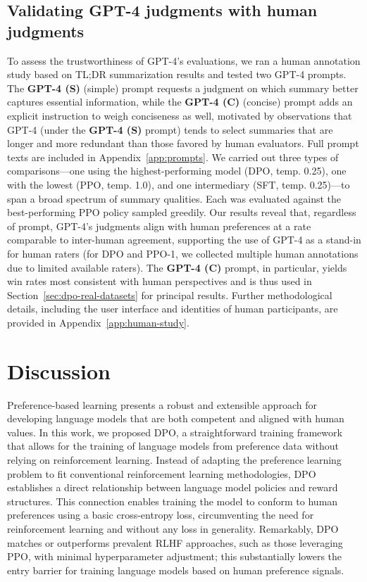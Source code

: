 \subsection{Validating GPT-4 judgments with human judgments}
\label{sec:human-judgments}

To assess the trustworthiness of GPT-4’s evaluations, we ran a human annotation study based on TL;DR summarization results and tested two GPT-4 prompts. The \textbf{GPT-4 (S)} (simple) prompt requests a judgment on which summary better captures essential information, while the \textbf{GPT-4 (C)} (concise) prompt adds an explicit instruction to weigh conciseness as well, motivated by observations that GPT-4 (under the \textbf{GPT-4 (S)} prompt) tends to select summaries that are longer and more redundant than those favored by human evaluators. Full prompt texts are included in Appendix~\ref{app:prompts}. We carried out three types of comparisons—one using the highest-performing model (DPO, temp. 0.25), one with the lowest (PPO, temp. 1.0), and one intermediary (SFT, temp. 0.25)—to span a broad spectrum of summary qualities. Each was evaluated against the best-performing PPO policy sampled greedily. Our results reveal that, regardless of prompt, GPT-4’s judgments align with human preferences at a rate comparable to inter-human agreement, supporting the use of GPT-4 as a stand-in for human raters (for DPO and PPO-1, we collected multiple human annotations due to limited available raters). The \textbf{GPT-4 (C)} prompt, in particular, yields win rates most consistent with human perspectives and is thus used in Section~\ref{sec:dpo-real-datasets} for principal results. Further methodological details, including the user interface and identities of human participants, are provided in Appendix~\ref{app:human-study}.

\section{Discussion}
Preference-based learning presents a robust and extensible approach for developing language models that are both competent and aligned with human values. In this work, we proposed DPO, a straightforward training framework that allows for the training of language models from preference data without relying on reinforcement learning. Instead of adapting the preference learning problem to fit conventional reinforcement learning methodologies, DPO establishes a direct relationship between language model policies and reward structures. This connection enables training the model to conform to human preferences using a basic cross-entropy loss, circumventing the need for reinforcement learning and without any loss in generality. Remarkably, DPO matches or outperforms prevalent RLHF approaches, such as those leveraging PPO, with minimal hyperparameter adjustment; this substantially lowers the entry barrier for training language models based on human preference signals.

